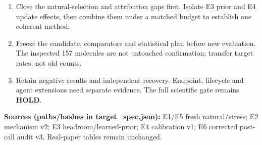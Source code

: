 \documentclass[10pt,letterpaper]{article}
\newcommand{\note}[1]{{\fontsize{8.5}{10.5}\selectfont #1\par}}
\newcommand{\sectionhead}[1]{\vspace{7pt}{\large\bfseries #1}\par\vspace{3pt}}
\begin{document}
\sectionhead{6. What would turn these goals into evidence?}
\begin{enumerate}\setlength{\itemsep}{1pt}
\item Close the natural-selection and attribution gaps first. Isolate E3 prior and E4 update effects, then combine them under a matched budget to establish one coherent method.
\item Freeze the candidate, comparators and statistical plan before new evaluation. The inspected 157 molecules are not untouched confirmation; transfer target rates, not old counts.
\item Retain negative results and independent recovery. Endpoint, lifecycle and agent extensions need separate evidence. The full scientific gate remains \textbf{HOLD}.
\end{enumerate}
\note{\textbf{Sources (paths/hashes in target\_spec.json):} E1/E5 fresh natural/stress; E2 mechanism v2; E3 headroom/learned-prior; E4 calibration v1; E6 corrected post-call audit v3. Real-paper tables remain unchanged.}
\end{document}
